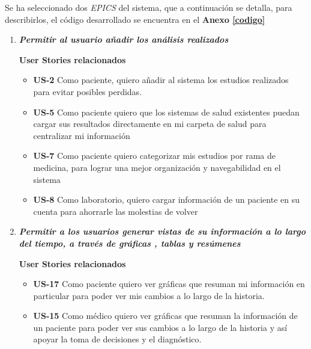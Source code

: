 \documentclass[a4paper,12pt]{article}
\begin{document}
Se ha seleccionado dos \textit{EPICS} del sistema, que a continuación se detalla, para describirlos, el código desarrollado se encuentra en el \textbf{Anexo \ref{codigo}}
\begin{enumerate}
\item \textit{\textbf{Permitir al usuario añadir los análisis realizados }}

\textbf{User Stories relacionados}
    \begin{itemize}
        \item \textbf{US-2 }Como paciente, quiero añadir al sistema los estudios realizados para evitar posibles perdidas.
        \item \textbf{US-5 }Como paciente quiero que los sistemas de salud existentes puedan cargar sus resultados directamente en mi carpeta de salud para centralizar mi información
        \item  \textbf{US-7} Como paciente quiero categorizar mis estudios por rama de medicina, para lograr una mejor organización y navegabilidad en el sistema
        \item \textbf{US-8} Como laboratorio, quiero cargar información de un paciente en su cuenta para ahorrarle las molestias de volver
    \end{itemize}
\item \textbf{\textit{Permitir a los usuarios generar vistas de su información a lo largo del tiempo, a través de gráficas , tablas y resúmenes }}

\textbf{User Stories relacionados}
    \begin{itemize}
        \item \textbf{US-17} Como paciente quiero ver gráficas que resuman mi información en particular para poder ver mis cambios a lo largo de la historia.
        \item \textbf{US-15} Como médico quiero ver gráficas que resuman la información de un paciente para poder ver sus cambios a lo largo de la historia y así apoyar la toma de decisiones y el diagnóstico.
    \end{itemize}
\end{enumerate}
\end{document}

